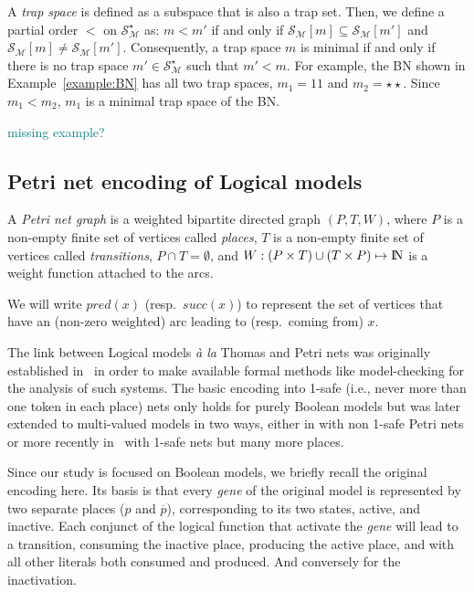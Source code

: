 \documentclass[runningheads]{llncs}
\newcommand{\sylvain}[1]{\textcolor{teal}{#1}}
\begin{document}
A \emph{trap space} is defined as a subspace that is also a trap set.
Then, we define a partial order \(<\) on \(\mathcal{S}_{\mathcal{M}}^{\star}\) as: \(m < m'\) if and only if \(\mathcal{S}_{\mathcal{M}}[m] \subseteq \mathcal{S}_{\mathcal{M}}[m']\) and \(\mathcal{S}_{\mathcal{M}}[m] \neq \mathcal{S}_{\mathcal{M}}[m']\).
Consequently, a trap space \(m\) is minimal if and only if there is no trap space \(m' \in \mathcal{S}_{\mathcal{M}}^{\star}\) such that \(m' < m\).
For example, the BN shown in Example~\ref{example:BN} has all two trap spaces, \(m_1 = 11\) and \(m_2 = \star\star\). Since \(m_1 < m_2\), \(m_1\) is a minimal trap space of the BN.

\sylvain{missing example?}

\subsection{Petri net encoding of Logical models}
\label{sec:encoding}

\begin{definition}

  A \emph{Petri net graph} is a weighted bipartite directed graph \((P, T, W)\),
  where \(P\) is a non-empty finite set of vertices called \emph{places},
  \(T\) is a non-empty finite set of vertices called \emph{transitions},
  \(P \cap T = \emptyset\),
  and \(W : (P \times T) \cup (T \times P) \mapsto {\rm I\!N} \) is a weight function attached to the arcs.

\end{definition}

We will write \(pred(x)\) (resp.\ \(succ(x)\)) to represent the set of vertices that have an (non-zero weighted) arc leading to (resp.\ coming from) \(x\).

The link between Logical models \emph{à la} Thomas and Petri nets was originally established in~\cite{chaouiya2004qualitative} in order to make available formal methods like model-checking for the analysis of such systems.
The basic encoding into 1-safe (i.e., never more than one token in each place) nets only holds for purely Boolean models but was later extended to multi-valued models in two ways, either in \cite{chaouiya2011petri} with non 1-safe Petri nets or more recently in~\cite{chatain2014characterization} with 1-safe nets but many more places.

Since our study is focused on Boolean models, we briefly recall the original encoding here.
Its basis is that every \emph{gene} of the original model is represented by two separate places (\(p\) and \(\overline{p}\)), corresponding to its two states, active, and inactive.
Each conjunct of the logical function that activate the \emph{gene} will lead to a transition, consuming the inactive place, producing the active place, and with all other literals both consumed and produced.
And conversely for the inactivation.
\end{document}
